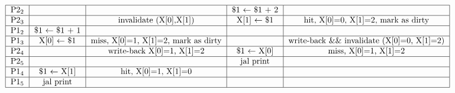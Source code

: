\documentclass[10pt,letterpaper]{article}
\begin{document}
\begin{enumerate}[label=\textbf{Problem \arabic*.}]
\begin{enumerate}[label=\Alph*)]
\[\begin{tabular}{|c|c|c|c|c|}
	\hline
	P2$_2$ & & & \$1 $\leftarrow$ \$1 + 2 & \\
	\hline
	P2$_3$ & & invalidate (X[0],X[1]) & X[1] $\leftarrow$ \$1 & hit, X[0]=0, X[1]=2, mark as dirty \\
	\hline
	P1$_2$ & \$1 $\leftarrow$ \$1 + 1 & & & \\
	\hline
	P1$_3$ & X[0] $\leftarrow$ \$1 & miss, X[0]=1, X[1]=2, mark as dirty & & write-back \&\& invalidate (X[0]=0, X[1]=2)\\
	\hline
	P2$_4$ & & write-back X[0]=1, X[1]=2 & \$1 $\leftarrow$ X[0] & miss, X[0]=1, X[1]=2 \\
	\hline
	P2$_5$ & & & jal print & \\
	\hline
	P1$_4$ & \$1 $\leftarrow$ X[1] & hit, X[0]=1, X[1]=0 & & \\
	\hline
	P1$_5$ & jal print & & & \\
	\hline
	\end{tabular}\]
	\end{enumerate}
\end{enumerate}
\end{document}
